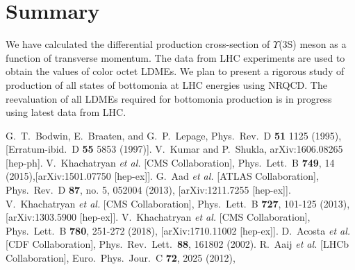\documentclass[twocolumn,amsmath,amssymb]{snp}
\begin{document}
\section*{Summary}
We have calculated the differential production cross-section of $\Upsilon$(3S) meson
as a function of transverse momentum. The data from LHC experiments are used to 
obtain the values of color octet LDMEs. We plan to present a rigorous study of 
production of all states of bottomonia at LHC energies using NRQCD.
The reevaluation of all LDMEs required for bottomonia production is in progress using 
latest data from LHC.         
\begin{thebibliography}{50}
G.~T.~Bodwin, E.~Braaten, and G.~P.~Lepage,
Phys.\ Rev.\ D {\bf 51} 1125 (1995), 
[Erratum-ibid.\ D {\bf 55} 5853 (1997)].
  V.~Kumar and P.~Shukla,
  arXiv:1606.08265 [hep-ph].
  V.~Khachatryan {\it et al.} [CMS Collaboration],
  Phys.\ Lett.\ B {\bf 749}, 14 (2015),[arXiv:1501.07750 [hep-ex]].
  G.~Aad {\it et al.} [ATLAS Collaboration],
  Phys.\ Rev.\ D {\bf 87}, no. 5, 052004 (2013),
  [arXiv:1211.7255 [hep-ex]].
  V.~Khachatryan {\it et al.} [CMS Collaboration],
  Phys.\ Lett.\ B {\bf 727}, 101-125 (2013),
  [arXiv:1303.5900 [hep-ex]].
  V.~Khachatryan {\it et al.} [CMS Collaboration],
  Phys.\ Lett.\ B {\bf 780}, 251-272 (2018),
  [arXiv:1710.11002 [hep-ex]].
  D.~Acosta {\it et al.} [CDF Collaboration],
  Phys.\ Rev.\ Lett.\ {\bf 88}, 161802 (2002).
  R.~Aaij {\it et al.} [LHCb Collaboration],
  Euro.\ Phys.\ Jour.\ C {\bf 72}, 2025 (2012),

\end{thebibliography}
\end{document}
